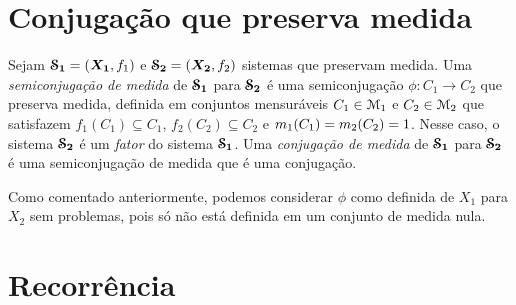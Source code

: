 \section{Conjugação que preserva medida}

\begin{definition}
Sejam $\bm{\mathcal{S}_1} = (\bm{X_1},f_1)$ e $\bm{\mathcal{S}_2} = (\bm{X_2},f_2)$ sistemas que preservam medida. Uma \emph{semiconjugação de medida} de $\bm{\mathcal{S}_1}$ para $\bm{\mathcal{S}_2}$ é uma semiconjugação $\phi: C_1 \to C_2$ que preserva medida, definida em conjuntos mensuráveis $C_1 \in \mathcal{M}_1$ e $C_2 \in \mathcal{M}_2$ que satisfazem ${f_1}(C_1) \subseteq C_1$, ${f_2}(C_2) \subseteq C_2$ e $m_1(C_1) = m_2(C_2) = 1$. Nesse caso, o sistema $\bm{\mathcal{S}_2}$ é um \emph{fator} do sistema $\bm{\mathcal{S}_1}$. Uma \emph{conjugação de medida} de $\bm{\mathcal{S}_1}$ para $\bm{\mathcal{S}_2}$ é uma semiconjugação de medida que é uma conjugação.

\begin{figure}
\centering
{}
\end{figure}
\end{definition}


Como comentado anteriormente, podemos considerar $\phi$ como definida de $X_1$ para $X_2$ sem problemas, pois só não está definida em um conjunto de medida nula.

\section{Recorrência}

